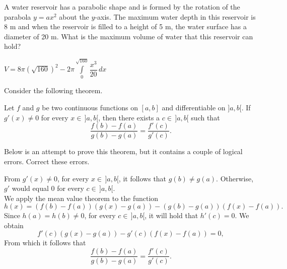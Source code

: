 \begin{Exercise} %
A water reservoir has a parabolic shape and is formed by the rotation of the parabola $y=ax^2$ about the $y$-axis. The maximum water depth in this reservoir is 8 m and when the reservoir is filled to a height of 5 m, the water surface has a diameter of 20 m. What is the maximum volume of water that this reservoir can hold?
\end{Exercise}

\begin{Answer}\phantom{}
$V = 8 \pi \left(\sqrt{160} \right)^2 - 2 \pi \displaystyle \int\limits_0^{\sqrt{160}} \dfrac{x^3}{20} \, dx$
\end{Answer}

\begin{Exercise} %
Consider the following theorem.
\begin{theorem}
	Let $f$ and $g$ be two continuous functions on $[a,b]$ and differentiable on $]a,b[$. If $g'(x) \neq 0$ for every $x \in\, ]a,b[$, then there exists a $c \in \, ]a,b[$ such that 
	\[ \dfrac{f(b)-f(a)}{g(b)-g(a)} = \dfrac{f'(c)}{g'(c)}. \]
\end{theorem} 

Below is an attempt to prove this theorem, but it contains a couple of logical errors. Correct these errors. \npar

From $g'(x) \neq 0$, for every $x \in\, ]a,b[$, it follows that $g(b) \neq g(a)$. Otherwise, $g'$ would equal 0 for every $c \in \, ]a,b[$. \\
We apply the mean value theorem to the function
\[h(x) = \left( f(b)-f(a) \right) \left(g(x)-g(a) \right) - \left( g(b)-g(a) \right) \left(f(x)-f(a) \right).  \]
Since $h(a)=h(b) \neq0$, for every $c\in\, ]a,b[$, it will hold that $h'(c)=0$. We obtain
\[ f'(c)\left( g(x)-g(a) \right)  - g'(c) \left( f(x)-f(a) \right) =0,\]
From which it follows that
\[ \dfrac{f(b)-f(a)}{g(b)-g(a)} = \dfrac{f'(c)}{g'(c)}. \]

\end{Exercise}

